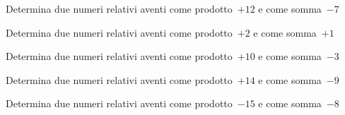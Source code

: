\begin{multicols}{2}
\begin{esercizio}
 Determina due numeri relativi aventi come prodotto~\(+12\) e come somma~\(-7\)
\end{esercizio}

\begin{esercizio}
 Determina due numeri relativi aventi come prodotto~\(+2\) e come somma~\(+1\)
\end{esercizio}

\begin{esercizio}
 Determina due numeri relativi aventi come prodotto~\(+10\) e come somma~\(-3\)
\end{esercizio}

\begin{esercizio}
 Determina due numeri relativi aventi come prodotto~\(+14\) e come somma~\(-9\)
\end{esercizio}

\begin{esercizio}
 Determina due numeri relativi aventi come prodotto~\(-15\) e come somma~\(-8\)
\end{esercizio}

\end{multicols}

